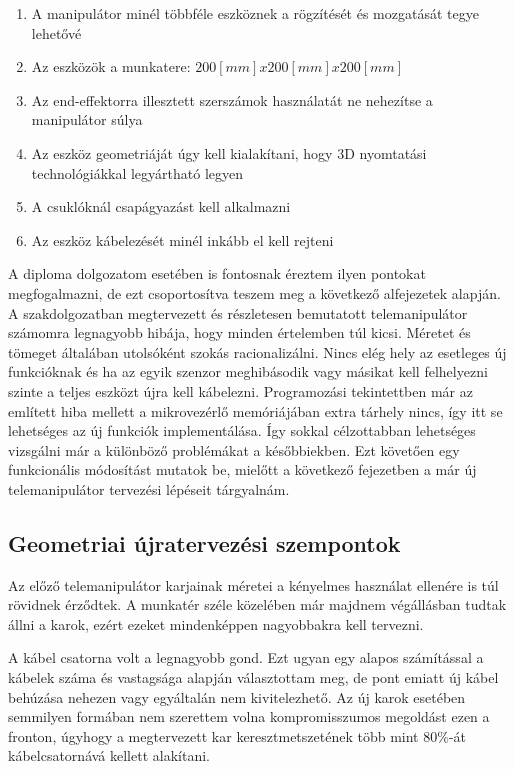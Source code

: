\begin{enumerate}
\item A manipulátor minél többféle eszköznek a rögzítését és mozgatását tegye lehetővé\cite{szakdoga}
\item Az eszközök a munkatere: $200[mm]x200[mm]x200[mm]$ \cite{szakdoga}
\item Az end-effektorra illesztett szerszámok használatát ne nehezítse a manipulátor súlya\cite{szakdoga}
\item Az eszköz geometriáját úgy kell kialakítani, hogy 3D nyomtatási technológiákkal legyártható legyen\cite{szakdoga}
\item A csuklóknál csapágyazást kell alkalmazni\cite{szakdoga}
\item Az eszköz kábelezését minél inkább el kell rejteni\cite{szakdoga}
\end{enumerate}

A diploma dolgozatom esetében is fontosnak éreztem ilyen pontokat megfogalmazni, de ezt csoportosítva teszem meg a következő alfejezetek alapján. A szakdolgozatban megtervezett és részletesen bemutatott telemanipulátor számomra legnagyobb hibája, hogy minden értelemben túl kicsi. Méretet és tömeget általában utolsóként szokás racionalizálni. Nincs elég hely az esetleges új funkcióknak és ha az egyik szenzor meghibásodik vagy másikat kell felhelyezni szinte a teljes eszközt újra kell kábelezni. Programozási tekintettben már az említett hiba mellett a mikrovezérlő memóriájában extra tárhely nincs, így itt se lehetséges az új funkciók implementálása. Így sokkal célzottabban lehetséges vizsgálni már a különböző problémákat a későbbiekben. Ezt követően egy funkcionális módosítást mutatok be, mielőtt a következő fejezetben a már új telemanipulátor tervezési lépéseit tárgyalnám.

\subsection{Geometriai újratervezési szempontok}

Az előző telemanipulátor karjainak méretei a kényelmes használat ellenére is túl rövidnek érződtek. A munkatér széle közelében már majdnem végállásban tudtak állni a karok, ezért ezeket mindenképpen nagyobbakra kell tervezni.

A kábel csatorna volt a legnagyobb gond. Ezt ugyan egy alapos számítással a kábelek száma és vastagsága alapján választottam meg, de pont emiatt új kábel behúzása nehezen vagy egyáltalán nem kivitelezhető. Az új karok esetében semmilyen formában nem szerettem volna kompromisszumos megoldást ezen a fronton, úgyhogy a megtervezett kar keresztmetszetének több mint $80\%$-át kábelcsatornává kellett alakítani.


